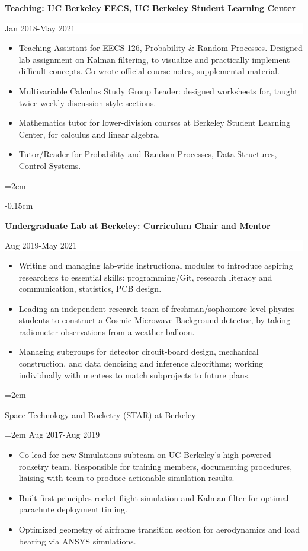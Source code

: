 \documentclass[paper=a4,fontsize=10pt]{scrartcl}
\newcommand{\EducationEntry}[4]{
		\noindent \textbf{#1} \hfill      %
		\colorbox{White}{%
			\parbox{5cm}{%
			\hfill\color{Black}#2}} \par  %
		\noindent #3 \par        %
		\noindent\hangindent=2em\hangafter=0 \small #4 %
		\normalsize \par}
\begin{document}
\EducationEntry{Teaching: UC Berkeley EECS, UC Berkeley Student Learning Center}{Jan 2018-May 2021}{
\begin{itemize}
\vspace{-0.15cm}
\setlength\itemsep{-0.3em}
\item Teaching Assistant for EECS 126, Probability \& Random Processes. Designed lab assignment on Kalman filtering, to visualize and practically implement difficult concepts. Co-wrote official course notes, supplemental material.
\item Multivariable Calculus Study Group Leader: designed worksheets for, taught twice-weekly discussion-style sections.
\item Mathematics tutor for lower-division courses at Berkeley Student Learning Center, for calculus and linear algebra.
\item Tutor/Reader for Probability and Random Processes, Data Structures, Control Systems.
\end{itemize}}

\vspace{-0.15cm}
\EducationEntry{Undergraduate Lab at Berkeley: Curriculum Chair and Mentor}{Aug 2019-May 2021}{
\begin{itemize}
\vspace{-0.15cm}
\setlength\itemsep{-0.3em}
\item Writing and managing lab-wide instructional modules to introduce aspiring researchers to essential skills: programming/Git, research literacy and communication, statistics, PCB design.
\item Leading an independent research team of freshman/sophomore level physics students to construct a Cosmic Microwave Background detector, by taking radiometer observations from a weather balloon.
\item Managing subgroups for detector circuit-board design, mechanical construction, and data denoising and inference algorithms; working individually with mentees to match subprojects to future plans. 
\end{itemize}}

\EducationEntry{Space Technology and Rocketry (STAR) at Berkeley}{Aug 2017-Aug 2019}{
\begin{itemize}
\vspace{-0.15cm}
\setlength\itemsep{-0.3em}
\item Co-lead for new Simulations subteam on UC Berkeley's high-powered rocketry team. Responsible for training members, documenting procedures, liaising with team to produce actionable simulation results.
\item Built first-principles rocket flight simulation and Kalman filter for optimal parachute deployment timing.
\item Optimized geometry of airframe transition section for aerodynamics and load bearing via ANSYS simulations.
\end{itemize}}
\end{document}
